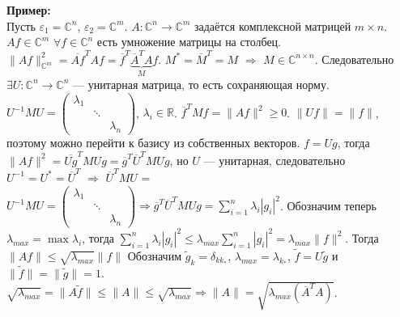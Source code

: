 \documentclass[12pt]{article}
\begin{document}
\textbf{Пример:}\\
Пусть $\varepsilon_1 = \mathbb C^n$, $\varepsilon_2 = \mathbb C^m$.
$A : \mathbb C^n \to \mathbb C^m$ задаётся комплексной матрицей $m \times n$.
$Af \in \mathbb C^m$ $\forall f \in \mathbb C^n$ есть умножение матрицы на столбец.
$\|Af\|^2_{\mathbb C^m} = \overline{Af}^T Af = \overline{f}^T \underbrace{\overline{A}^T A}_{M} f$.
$M^*=\overline{M}^T=M$ $\Rightarrow$ $M \in \mathbb C^{n \times n}$.
Следовательно $\exists U : \mathbb C^n \to \mathbb C^n$ --- унитарная матрица, то есть сохраняющая норму.
$U^{-1}MU =
    \left(
        \begin{array}{ccc}
            \lambda_1 & \phantom{x} & \phantom{x}\\
            \phantom{x} & \ddots & \phantom{x}\\
            \phantom{x} & \phantom{x} & \lambda_n
        \end{array}
    \right)
$, $\lambda_i \in \mathbb R$.
$\overline{f}^TMf = \|Af\|^2 \ge 0$.
$\|Uf\|=\|f\|$, поэтому можно перейти к базису из собственных векторов.
$f=Ug$, тогда $\|Af\|^2 = \overline{Ug}^TM Ug = \overline{g}^T \overline{U}^T M Ug$, но $U$ --- унитарная, следовательно
$U^{-1} = U^* = \overline{U}^T$ $\Rightarrow$ $\overline{U}^T M U$ = $U^{-1} M U =
    \left(
        \begin{array}{ccc}
            \lambda_1 & \phantom{x} & \phantom{x}\\
            \phantom{x} & \ddots & \phantom{x}\\
            \phantom{x} & \phantom{x} & \lambda_n
        \end{array}
    \right)
\Rightarrow \overline{g}^T \overline{U}^T M Ug = \sum\limits_{i = 1}^n \lambda_i |g_i|^2$.
Обозначим теперь $\lambda_{max} = \max\lambda_i$, тогда $\sum\limits_{i = 1}^n \lambda_i |g_i|^2 \le \lambda_{max}\sum\limits_{i = 1}^n |g_i|^2 =
\lambda_{max} \|f\|^2$.
Тогда $\|Af\| \le \sqrt{\lambda_{max}}\|f\|$
Обозначим $\tilde{g}_k = \delta_{kk_*}$, $\lambda_{max} = \lambda_{k_*}$, $\tilde{f} = U\tilde{g}$ и $\|\tilde{f}\| = \|\tilde{g}\| = 1$.
$\sqrt{\lambda_{max}} = \|A\tilde{f}\| \le \|A\| \le \sqrt{\lambda_{max}} \Rightarrow \|A\| = \sqrt{\lambda_{max}(\overline{A}^T A)}$.
\end{document}
